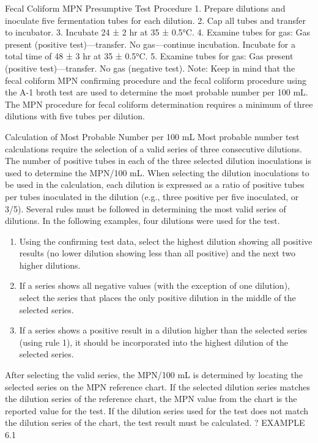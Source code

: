 \documentclass{article}
\begin{document}
Fecal Coliform MPN Presumptive Test Procedure 1. Prepare dilutions and
inoculate five fermentation tubes for each dilution. 2. Cap all tubes
and transfer to incubator. 3. Incubate 24 ± 2 hr at 35 ± 0.5°C. 4.
Examine tubes for gas: Gas present (positive test)---transfer. No
gas---continue incubation. Incubate for a total time of 48 ± 3 hr at 35
± 0.5°C. 5. Examine tubes for gas: Gas present (positive
test)---transfer. No gas (negative test). Note: Keep in mind that the
fecal coliform MPN confirming procedure and the fecal coliform procedure
using the A-1 broth test are used to determine the most probable number
per 100 mL. The MPN procedure for fecal coliform determination requires
a minimum of three dilutions with five tubes per dilution.

Calculation of Most Probable Number per 100 mL Most probable number test
calculations require the selection of a valid series of three
consecutive dilutions. The number of positive tubes in each of the three
selected dilution inoculations is used to determine the MPN/100 mL. When
selecting the dilution inoculations to be used in the calculation, each
dilution is expressed as a ratio of positive tubes per tubes inoculated
in the dilution (e.g., three positive per five inoculated, or 3/5).
Several rules must be followed in determining the most valid series of
dilutions. In the following examples, four dilutions were used for the
test.

\begin{enumerate}
\def\labelenumi{\arabic{enumi}.}
\tightlist
\item
  Using the confirming test data, select the highest dilution showing
  all positive results (no lower dilution showing less than all
  positive) and the next two higher dilutions.
\item
  If a series shows all negative values (with the exception of one
  dilution), select the series that places the only positive dilution in
  the middle of the selected series.
\item
  If a series shows a positive result in a dilution higher than the
  selected series (using rule 1), it should be incorporated into the
  highest dilution of the selected series.
\end{enumerate}

After selecting the valid series, the MPN/100 mL is determined by
locating the selected series on the MPN reference chart. If the selected
dilution series matches the dilution series of the reference chart, the
MPN value from the chart is the reported value for the test. If the
dilution series used for the test does not match the dilution series of
the chart, the test result must be calculated. ? EXAMPLE 6.1
\end{document}
